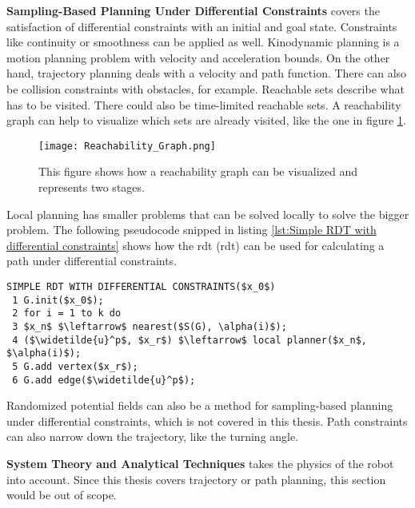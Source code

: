 \textbf{Sampling-Based Planning Under Differential Constraints} covers the satisfaction of differential constraints with an initial and goal state. Constraints like continuity or smoothness can be applied as well. Kinodynamic planning is a motion planning problem with velocity and acceleration bounds. On the other hand, trajectory planning deals with a velocity and path function. There can also be collision constraints with obstacles, for example.
Reachable sets describe what has to be visited. There could also be time-limited reachable sets. A reachability graph can help to visualize which sets are already visited, like the one in figure \ref{fig:Reachability Graph}.
\begin{figure}[H]
    \centering
    \texttt{[image: Reachability\_Graph.png]}
    \caption{This figure shows how a reachability graph can be visualized and represents two stages. \cite{planning_algorithms_steven_m_lavalle}}
    \label{fig:Reachability Graph}
\end{figure}
Local planning has smaller problems that can be solved locally to solve the bigger problem. The following pseudocode snipped in listing \ref{lst:Simple RDT with differential constraints} shows how the \acrlong{rdt} (\acrshort{rdt}) can be used for calculating a path under differential constraints.
\begin{lstlisting}[mathescape=true, caption={The local planning method computes $x_r$. A new vertex will be available: $x_r$. \cite{planning_algorithms_steven_m_lavalle}}, label={lst:Simple RDT with differential constraints}]
SIMPLE RDT WITH DIFFERENTIAL CONSTRAINTS($x_0$)
 1 G.init($x_0$);
 2 for i = 1 to k do
 3 $x_n$ $\leftarrow$ nearest($S(G), \alpha(i)$);
 4 ($\widetilde{u}^p$, $x_r$) $\leftarrow$ local planner($x_n$, $\alpha(i)$);
 5 G.add vertex($x_r$);
 6 G.add edge($\widetilde{u}^p$);
\end{lstlisting}
Randomized potential fields can also be a method for sampling-based planning under differential constraints, which is not covered in this thesis. Path constraints can also narrow down the trajectory, like the turning angle. \cite{planning_algorithms_steven_m_lavalle}

\textbf{System Theory and Analytical Techniques} takes the physics of the robot into account. Since this thesis covers trajectory or path planning, this section would be out of scope. \cite{planning_algorithms_steven_m_lavalle}

